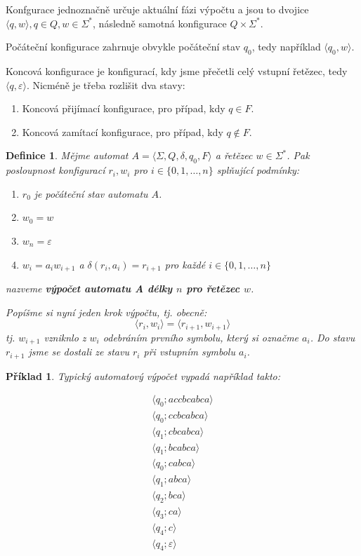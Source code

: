 \documentclass[10pt, a4paper, titlepage]{article}
\theoremstyle{note}
\newtheorem{definice}{Definice}
\newtheorem{priklad}{Příklad}
\begin{document}
Konfgurace jednoznačně určuje aktuální fázi výpočtu a jsou to dvojice $\langle q, w \rangle, q \in Q, w \in \Sigma^*$, následně
samotná konfigurace $Q \times \Sigma^*$.

Počáteční konfigurace zahrnuje obvykle počáteční stav $q_0$, tedy například $\langle q_0, w \rangle$.

Koncová konfigurace je konfigurací, kdy jsme přečetli celý vstupní řetězec,
tedy $\langle q, \varepsilon \rangle$. Nicméně je třeba rozlišit dva stavy:
\begin{enumerate}
\item
Koncová přijímací konfigurace, pro případ, kdy $q \in F$.

\item
Koncová zamítací konfigurace, pro případ, kdy $q \notin F$.
\end{enumerate}

\begin{definice}
Mějme automat $A = \langle \Sigma, Q, \delta, q_0, F \rangle$ a řetězec $w \in \Sigma^*$. Pak posloupnost
konfigurací $r_i, w_i$ pro $i \in \lbrace 0, 1, \ldots, n \rbrace$ splňující podmínky:
\begin{enumerate}
\item
$r_0$ je počáteční stav automatu $A$.

\item
$w_0 = w$

\item
$w_n = \varepsilon$

\item
$w_i = a_i w_{i+1}$ a $\delta(r_i, a_i) = r_{i+1}$ pro každé $i \in \lbrace 0,1,\ldots,n \rbrace$
\end{enumerate}
nazveme \textbf{výpočet automatu A délky $n$ pro řetězec $w$}.

Popíšme si nyní jeden krok výpočtu, tj. obecně:
$$
\langle r_i, w_i \rangle = \langle r_{i+1}, w_{i+1} \rangle
$$
tj. $w_{i+1}$ vzniknlo z $w_i$ odebráním prvního symbolu, který si označme $a_i$. Do stavu $r_{i+1}$ jsme se dostali ze
stavu $r_i$ při vstupním symbolu $a_i$.
\end{definice}

\newpage
\begin{priklad}
Typický automatový výpočet vypadá například takto:

\begin{gather*}
\langle q_0 ; accbcabca \rangle \\
\langle q_0 ; ccbcabca \rangle \\
\langle q_1 ; cbcabca \rangle \\
\langle q_1 ; bcabca \rangle \\
\langle q_0 ; cabca \rangle \\
\langle q_1 ; abca \rangle \\
\langle q_2 ; bca \rangle \\
\langle q_3 ; ca \rangle \\
\langle q_4 ; c \rangle \\
\langle q_4 ; \varepsilon \rangle \\
\end{gather*}
\end{priklad}
\end{document}

